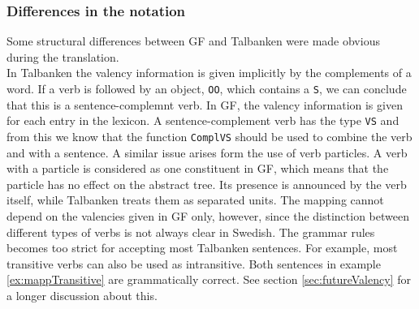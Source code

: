 \documentclass{report}
\begin{document}
\subsubsection{Differences in the notation}
Some structural differences between GF and Talbanken were made obvious during the
translation. \\
In Talbanken the valency information is given implicitly by the complements
of a word. If a verb is followed by an object, \verb-OO-, which contains a
\verb-S-, we can conclude that this is a sentence-complemnt verb.
In GF, the valency information is given for each entry in the lexicon.
A sentence-complement verb has the type \verb-VS- and from this we know 
that the function \verb-ComplVS- should be used to combine the verb and with a 
sentence.
A similar issue arises form the use of verb particles. A verb with a
particle is considered as one constituent in GF, which means that the particle
has no effect on the abstract tree. Its presence is announced by the verb
itself, while Talbanken treats them as separated units.
The mapping cannot depend on the valencies given in GF only, however, 
since the distinction between different types of verbs is not always clear in Swedish.
The grammar rules becomes too strict for accepting most Talbanken sentences.
For example, most transitive verbs can also be used as intransitive. Both sentences in
example \ref{ex:mappTransitive} are grammatically correct.
\label{ex:mappTransitive}
See section \ref{sec:futureValency} for a longer discussion about this.\\
\end{document}
